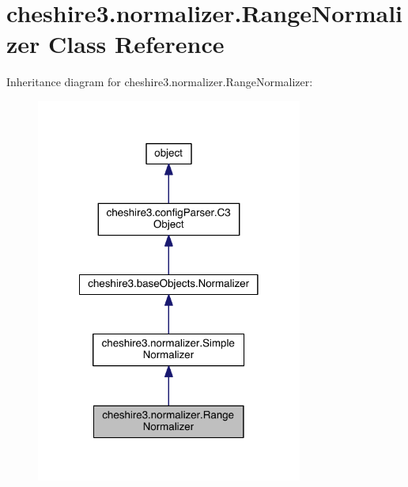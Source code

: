 \hypertarget{classcheshire3_1_1normalizer_1_1_range_normalizer}{\section{cheshire3.\-normalizer.\-Range\-Normalizer Class Reference}
\label{classcheshire3_1_1normalizer_1_1_range_normalizer}
}


Inheritance diagram for cheshire3.\-normalizer.\-Range\-Normalizer\-:
\nopagebreak
\begin{figure}[H]
\begin{center}
\leavevmode
\includegraphics[width=248pt]{classcheshire3_1_1normalizer_1_1_range_normalizer__inherit__graph}
\end{center}
\end{figure}


